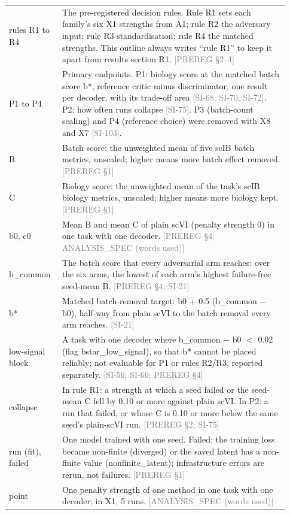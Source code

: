 \documentclass[11pt]{article}
\newcommand{\src}[1]{{\scriptsize\textcolor{gray}{[#1]}}}
\begin{document}
{\begin{longtable}{>{\raggedright\arraybackslash}p{0.17\linewidth}>{\raggedright\arraybackslash}p{0.76\linewidth}}
rules R1 to R4 & The pre-registered decision rules. Rule R1 sets each family's six X1 strengths from A1; rule R2 the adversary input; rule R3 standardisation; rule R4 the matched strengths. This outline always writes ``rule R1'' to keep it apart from results section R1. \src{PREREG \S2--4} \\
P1 to P4 & Primary endpoints. P1: biology score at the matched batch score b*, reference critic minus discriminator, one result per decoder, with its trade-off area \src{SI-68; SI-70; SI-72}. P2: how often runs collapse \src{SI-75}. P3 (batch-count scaling) and P4 (reference choice) were removed with X8 and X7 \src{SI-103}. \\
B & Batch score: the unweighted mean of five scIB batch metrics, unscaled; higher means more batch effect removed. \src{PREREG \S1} \\
C & Biology score: the unweighted mean of the task's scIB biology metrics, unscaled; higher means more biology kept. \src{PREREG \S1} \\
b0, c0 & Mean B and mean C of plain scVI (penalty strength 0) in one task with one decoder. \src{PREREG \S4; ANALYSIS\_SPEC (words used)} \\
b\_common & The batch score that every adversarial arm reaches: over the six arms, the lowest of each arm's highest failure-free seed-mean B. \src{PREREG \S4; SI-21} \\
b* & Matched batch-removal target: b0 + 0.5 (b\_common $-$ b0), half-way from plain scVI to the batch removal every arm reaches. \src{SI-21} \\
low-signal block & A task with one decoder where b\_common $-$ b0 $<$ 0.02 (flag bstar\_low\_signal), so that b* cannot be placed reliably; not evaluable for P1 or rules R2/R3, reported separately. \src{SI-56; SI-66; PREREG \S4} \\
collapse & In rule R1: a strength at which a seed failed or the seed-mean C fell by 0.10 or more against plain scVI. In P2: a run that failed, or whose C is 0.10 or more below the same seed's plain-scVI run. \src{PREREG \S2; SI-75} \\
run (fit), failed & One model trained with one seed. Failed: the training loss became non-finite (diverged) or the saved latent has a non-finite value (nonfinite\_latent); infrastructure errors are rerun, not failures. \src{PREREG \S1} \\
point & One penalty strength of one method in one task with one decoder; in X1, 5 runs. \src{ANALYSIS\_SPEC (words used)} \\

\end{longtable}}
\end{document}
